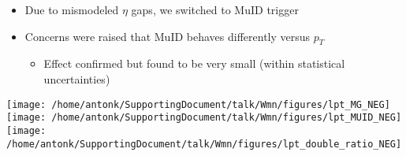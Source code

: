 {
\begin{itemize}
\item Due to mismodeled $\eta$ gaps, we switched to MuID trigger
\item Concerns were raised that MuID behaves differently versus $p_T$
\begin{itemize}
\item Effect confirmed but found to be very small (within statistical uncertainties)
\end{itemize}
\end{itemize}

\centering
\texttt{[image: /home/antonk/SupportingDocument/talk/Wmn/figures/lpt\_MG\_NEG]}
\texttt{[image: /home/antonk/SupportingDocument/talk/Wmn/figures/lpt\_MUID\_NEG]}
\texttt{[image: /home/antonk/SupportingDocument/talk/Wmn/figures/lpt\_double\_ratio\_NEG]}

\vspace{0.5cm}

}



